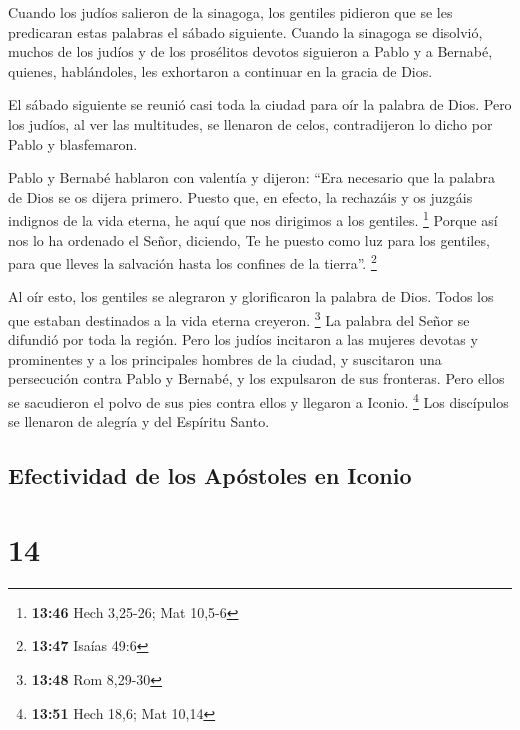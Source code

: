  Cuando los judíos salieron de la sinagoga, los gentiles
pidieron que se les predicaran estas palabras el sábado siguiente.
 Cuando la sinagoga se disolvió, muchos de los judíos y
de los prosélitos devotos siguieron a Pablo y a Bernabé, quienes,
hablándoles, les exhortaron a continuar en la gracia de Dios.

 El sábado siguiente se reunió casi toda la ciudad para
oír la palabra de Dios.  Pero los judíos, al ver las
multitudes, se llenaron de celos, contradijeron lo dicho por Pablo y
blasfemaron.

 Pablo y Bernabé hablaron con valentía y dijeron: ``Era
necesario que la palabra de Dios se os dijera primero. Puesto que, en
efecto, la rechazáis y os juzgáis indignos de la vida eterna, he aquí
que nos dirigimos a los gentiles. \footnote{\textbf{13:46} Hech 3,25-26;
  Mat 10,5-6}  Porque así nos lo ha ordenado el Señor,
diciendo, Te he puesto como luz para los gentiles, para que lleves la
salvación hasta los confines de la tierra''. \footnote{\textbf{13:47}
  Isaías 49:6}

 Al oír esto, los gentiles se alegraron y glorificaron la
palabra de Dios. Todos los que estaban destinados a la vida eterna
creyeron. \footnote{\textbf{13:48} Rom 8,29-30}  La
palabra del Señor se difundió por toda la región.  Pero
los judíos incitaron a las mujeres devotas y prominentes y a los
principales hombres de la ciudad, y suscitaron una persecución contra
Pablo y Bernabé, y los expulsaron de sus fronteras.  Pero
ellos se sacudieron el polvo de sus pies contra ellos y llegaron a
Iconio. \footnote{\textbf{13:51} Hech 18,6; Mat 10,14} 
Los discípulos se llenaron de alegría y del Espíritu Santo.

\hypertarget{efectividad-de-los-apuxf3stoles-en-iconio}{%
\subsection{Efectividad de los Apóstoles en
Iconio}\label{efectividad-de-los-apuxf3stoles-en-iconio}}

\hypertarget{section-13}{%
\section{14}\label{section-13}}

